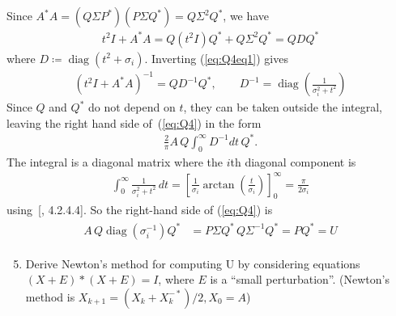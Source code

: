 \documentclass[10pt, A4paper]{article}
\DeclareMathOperator{\diag}{diag}
\begin{document}
Since $A^*A = (Q\Sigma P^*)(P\Sigma Q^*) = Q\Sigma^2Q^*$, we have
\begin{align}
	t^2I + A^*A = Q(t^2I)Q^* + Q \Sigma^2Q^* = QDQ^*
	\label{eq:Q4eq1}
\end{align}
where $D \coloneqq \diag(t^2 + \sigma_i)$.
Inverting (\ref{eq:Q4eq1}) gives
\begin{align}
	(t^2I + A^*A)^{-1} = QD^{-1}Q^*, \qquad
	D^{-1} = \diag\left(\frac{1}{\sigma_i^2 + t^2} \right)
\end{align}
Since $Q$ and $Q^*$ do not depend on $t$, they can be taken outside the 
integral, leaving the right hand side of~(\ref{eq:Q4}) in the form
\begin{align}
	\frac{2}{\pi} A\, Q\int_{0}^{\infty}D^{-1}dt\, Q^*.
\end{align}
The integral is a diagonal matrix where the $i$th diagonal component is
\begin{align}
	\int_{0}^{\infty} \frac{1}{\sigma_i^2 + t^2} \, dt =
	\left[\frac{1}{\sigma_i} \arctan \left(\frac{t}{\sigma_i}\right)
	\right]_0^{\infty} = \frac{\pi}{2\sigma_i}
\end{align}
using~[\citealp{jeda2008}, 4.2.4.4]. So the right-hand side of 
(\ref{eq:Q4}) is
\begin{align}
	\begin{split}
	A\,Q\diag\left(\sigma_i^{-1}\right)Q^*&=
	P\Sigma Q^* \, Q \Sigma^{-1}Q^* = PQ^* = U 
	\end{split}
\end{align}





\vspace{0.2cm}
\begin{enumerate}
	\setcounter{enumi}{4}
	\item Derive Newton's method for computing U by considering
	equations $(X+E)*(X+E) = I$, where $E$ is a ``small perturbation''.
	(Newton's method is $X_{k+1} = (X_k + X_k^{-*})/2, X_0 = A$)
\end{enumerate}
\end{document}
